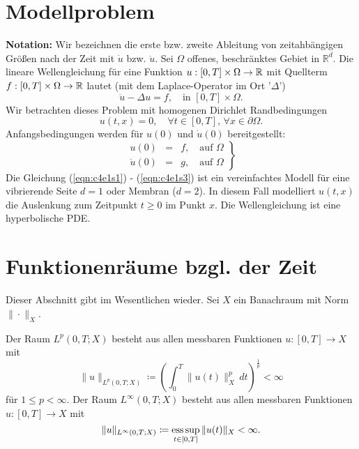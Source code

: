 \documentclass[../skript.tex]{subfiles}
\begin{document}
\section{Modellproblem}\label{sec:c4e1}
\textbf{Notation:} Wir bezeichnen die erste bzw. zweite Ableitung von zeitahbängigen Größen nach der Zeit mit $\dot{u}$ bzw. $\ddot{u}$. Sei $\Omega$ offenes, beschränktes Gebiet in $\mathbb{R}^d$. Die lineare Wellengleichung für eine Funktion $u:[0,T]\times\Omega\to\mathbb{R}$ mit Quellterm $f:[0,T]\times\Omega\to\mathbb{R}$ lautet (mit dem Laplace-Operator im Ort '$\Delta$')
\begin{equation}\label{eqn:c4e1s1}
	\ddot{u}-\Delta u = f,\quad\text{in }[0,T]\times\Omega.
\end{equation}
Wir betrachten dieses Problem mit homogenen Dirichlet Randbedingungen
\begin{equation}\label{eqn:c4e1s2}
	u(t,x) = 0,\quad\forall t\in[0,T],\,\forall x\in\partial\Omega.
\end{equation}
Anfangsbedingungen werden für $u(0)$ und $\dot{u}(0)$ bereitgestellt:
\begin{equation}\label{eqn:c4e1s3}
	\left.
	\begin{aligned}
		u(0) &=& f,\quad\text{auf }\Omega\\
		\dot{u}(0) &=& g,\quad\text{auf }\Omega
	\end{aligned}
	\right\}
\end{equation}
Die Gleichung (\ref {eqn:c4e1s1}) - (\ref {eqn:c4e1s3}) ist ein vereinfachtes Modell für eine vibrierende Seite $d=1$ oder Membran ($d=2$). In diesem Fall modelliert $u(t,x)$ die Auslenkung zum Zeitpunkt $t\geq 0$ im Punkt $x$. Die Wellengleichung ist eine hyperbolische PDE.

\section{Funktionenräume bzgl. der Zeit} 
Dieser Abschnitt gibt im Wesentlichen \cite[Sec. 5.9.2]{Evans} wieder. Sei $X$ ein Banachraum mit Norm $\|\cdot\|_X$.
\begin{definition}\label{def:c4e2s1}
	Der Raum $L^p(0,T;X)$ besteht aus allen messbaren Funktionen $u:[0,T]\to X$ mit
	\[
		\|u\|_{L^p(0,T;X)} \coloneqq \left( \int_0^T \|u(t)\|_X^p\,dt \right)^{\frac{1}{p}} < \infty
	\]
	für $1\leq p < \infty$.\newline\noindent
	Der Raum $L^\infty(0,T;X)$ besteht aus allen messbaren Funktionen $u:[0,T]\to X$ mit 
	\[
		\|u\|_{L^\infty(0,T;X)} \coloneqq \operatorname*{ess\,sup}_{t\in[0,T]} \|u(t)\|_X < \infty.
	\]
\end{definition}
\end{document}
